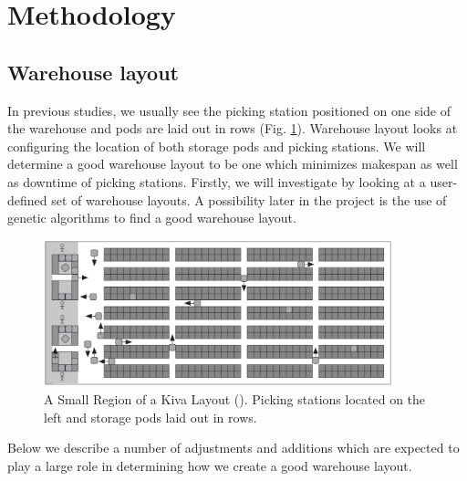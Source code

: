 \documentclass[a4paper,11pt]{article}
\begin{document}




\section{Methodology}
\label{method}

\subsection{Warehouse layout}
\label{warehouselayout}
In previous studies, we usually see the picking station positioned on one side of the warehouse and pods are laid out in rows (Fig. \ref{kivalayout1}). Warehouse layout looks at configuring the location of both storage pods and picking stations. We will determine a good warehouse layout to be one which minimizes makespan as well as downtime of picking stations. Firstly, we will investigate by looking at a user-defined set of warehouse layouts. A possibility later in the project is the use of genetic algorithms to find a good warehouse layout. 

\begin{figure}[h]
	\centering
	\includegraphics[width=0.9\textwidth]{graphics/kivasystemlayout}
	\caption{A Small Region of a Kiva Layout (\cite{wurman2008coordinating}). Picking stations located on the left and storage pods laid out in rows.}
	\label{kivalayout1}
\end{figure}

\noindent Below we describe a number of adjustments and additions which are expected to play a large role in determining how we create a good warehouse layout.
\end{document}
